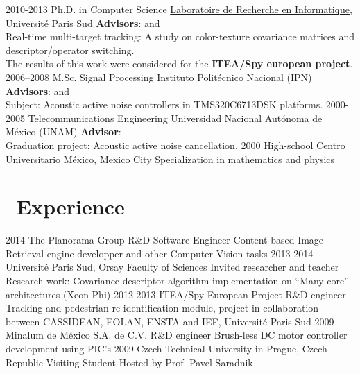 \documentclass[]{friggeri-cv}
\def\suitcase{{\FA \faSuitcase}}
\begin{document}
\begin{entrylist}
  \entry
    {2010-2013}
    {Ph.D. {\normalfont in Computer Science}}
    {\href{http://www.lri.fr}{Laboratoire de Recherche en Informatique}, Université Paris Sud}
    {\textbf{Advisors}: \href{https://www.lri.fr/~lacas/}{} and \href{http://m.i.c.h.e.l.e.free.fr/}{}\\
    Real-time multi-target tracking: A study on color-texture covariance matrices and descriptor/operator switching. \\
    The results of this work were considered for the \textbf{ITEA/Spy european project}.
    }
  \entry
    {2006–2008}
    {M.Sc. {\normalfont Signal Processing}}
    {Instituto Politécnico Nacional (IPN)}
    {
      \textbf{Advisors}:  and  \\
      Subject: Acoustic active noise controllers in TMS320C6713DSK platforms.
    }
  \entry
    {2000-2005}
    {Telecommunications Engineering}
    {Universidad Nacional Autónoma de México (UNAM)}
    {
      \textbf{Advisor}:  \\
      Graduation project: Acoustic active noise cancellation.
    }
  \entry
    {2000}
    {High-school}
    {Centro Universitario México, Mexico City}
    {Specialization in mathematics and physics}
\end{entrylist}

\section{{\suitcase}\ Experience}

\begin{entrylist}
  \entry
    {2014}
    {The Planorama Group}
    {R\&D Software Engineer}
    {Content-based Image Retrieval engine developper and other Computer Vision tasks}
  \entry
    {2013-2014}
    {Université Paris Sud, Orsay Faculty of Sciences}
    {Invited researcher and teacher}
    {Research work: Covariance descriptor algorithm implementation on \enquote{Many-core} architectures (Xeon-Phi)}
  \entry
    {2012-2013}
    {ITEA/Spy European Project}
    {R\&D engineer}
    {Tracking and pedestrian re-identification module, project in collaboration between CASSIDEAN, EOLAN, ENSTA and IEF, Université Paris Sud}
  \entry
    {2009}
    {Minalum de México S.A. de C.V.}
    {R\&D engineer}
    {Brush-less DC motor controller development using PIC's}
  \entry
    {2009}
    {Czech Technical University in Prague, Czech Republic}
    {Visiting Student}
    {Hosted by Prof. Pavel Saradnik}
\end{entrylist}
\end{document}
